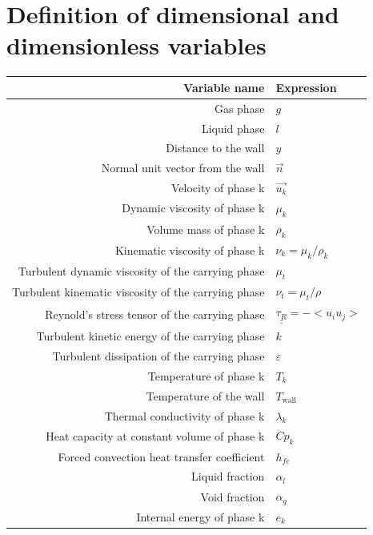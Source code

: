 \documentclass[a4paper,12pt]{report}
\newcommand{\1}{\mathds 1}
\begin{document}
\tableofcontents

\pagebreak

\section*{Definition of dimensional and dimensionless variables}
\begin{center}
\begin{tabular}{|r|l|}
	\hline Variable name & Expression \\ \hline \hline
	Gas phase & $g$ \\ \hline
	Liquid phase & $l$ \\ \hline
	Distance to the wall & $y$ \\ \hline
	Normal unit vector from the wall & $\overrightarrow{n}$ \\ \hline
	Velocity of phase k & $\overrightarrow{u_k}$\\ \hline
	Dynamic viscosity of phase k
		& $\mu_k $ \\ \hline
	Volume mass of phase k
		& $\rho_k$ \\ \hline
	Kinematic viscosity of phase k
		& $\nu_k = \mu_k/\rho_k$ \\ \hline
	Turbulent dynamic viscosity of the carrying phase
		& $\mu_{t} $ \\ \hline
	Turbulent kinematic viscosity of the carrying phase
		& $\nu_t = \mu_t/\rho$ \\ \hline
	Reynold's stress tensor of the carrying phase
		& $\underline{\underline{\tau_R}} = - <u_iu_j>$ \\ \hline
	Turbulent kinetic energy of the carrying phase
		& $k$ \\ \hline
	Turbulent dissipation of the carrying phase
		& $\varepsilon$ \\ \hline	
	Temperature of phase k
		& $T_{k}$ \\ \hline
	Temperature of the wall
		& $T_\text{wall}$ \\ \hline
	Thermal conductivity of phase k
		& $\lambda_k $ \\ \hline
	Heat capacity at constant volume of phase k
		& $Cp_k$ \\ \hline
	Forced convection heat transfer coefficient
		& $h_{fc}$	\\ \hline
	Liquid fraction 
		& $\alpha_l $ \\ \hline
	Void fraction 
		& $\alpha_g $ \\ \hline
	Internal energy of phase k
		& $e_k $ \\ \hline

\end{tabular}
\end{center}
\end{document}
